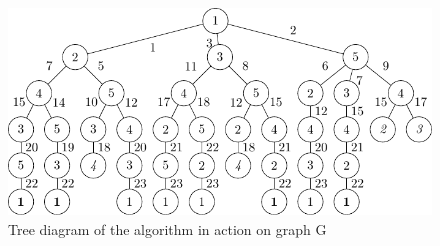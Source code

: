 \begin{figure}
\centering
\includegraphics[keepaspectratio,width=1.0\textwidth,height=0.35\textheight]{chapters/tsp/figs/ugraph-figure1}
\caption[A tree diagram representing all potential evolutions of the \gls{cps}  algorithm on the graph in \cref{fig:tsp:ugraph}]{\label{fig:tsp:utree}Tree diagram of the algorithm in action on graph G}
\end{figure}

\begin{cpobjectsfloat}
\begin{cpobjects}
    
    
    
    
\end{cpobjects}
\caption[Starting set of subcells from \cref{fig:tsp:utree}]{\label{objs:tsp:obj1}Set of subcells from G in the skin membrane at the initial state}
\end{cpobjectsfloat}

